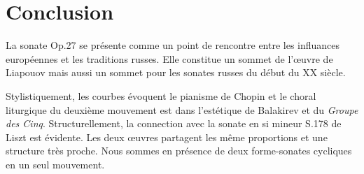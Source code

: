 \section{Conclusion}

La sonate Op.27 se présente comme un point de rencontre entre les influances européennes et les traditions russes. Elle constitue un sommet de l'œuvre de Liapouov mais aussi un sommet pour les sonates russes du début du XX\ieme{} siècle.

Stylistiquement, les courbes évoquent le pianisme de Chopin et le choral liturgique du deuxième mouvement est dans l'estétique de Balakirev et du \emph{Groupe des Cinq}. Structurellement, la connection avec la sonate en si mineur S.178 de Liszt est évidente. Les deux œuvres partagent les même proportions et une structure très proche. Nous sommes en présence de deux forme-sonates cycliques en un seul mouvement.

